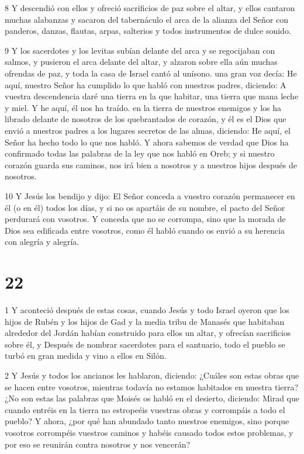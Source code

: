 \par 8 Y descendió con ellos y ofreció sacrificios de paz sobre el altar, y ellos cantaron muchas alabanzas y sacaron del tabernáculo el arca de la alianza del Señor con panderos, danzas, flautas, arpas, salterios y todos instrumentos de dulce sonido.

\par 9 Y los sacerdotes y los levitas subían delante del arca y se regocijaban con salmos, y pusieron el arca delante del altar, y alzaron sobre ella aún muchas ofrendas de paz, y toda la casa de Israel cantó al unísono. una gran voz decía: He aquí, nuestro Señor ha cumplido lo que habló con nuestros padres, diciendo: A vuestra descendencia daré una tierra en la que habitar, una tierra que mana leche y miel. Y he aquí, él nos ha traído. en la tierra de nuestros enemigos y los ha librado delante de nosotros de los quebrantados de corazón, y él es el Dios que envió a nuestros padres a los lugares secretos de las almas, diciendo: He aquí, el Señor ha hecho todo lo que nos habló. Y ahora sabemos de verdad que Dios ha confirmado todas las palabras de la ley que nos habló en Oreb; y si nuestro corazón guarda sus caminos, nos irá bien a nosotros y a nuestros hijos después de nosotros.

\par 10 Y Jesús los bendijo y dijo: El Señor conceda a vuestro corazón permanecer en él (o en él) todos los días, y si no os apartáis de su nombre, el pacto del Señor perdurará con vosotros. Y conceda que no se corrompa, sino que la morada de Dios sea edificada entre vosotros, como él habló cuando os envió a su herencia con alegría y alegría.



\chapter{22}

\par 1 Y aconteció después de estas cosas, cuando Jesús y todo Israel oyeron que los hijos de Rubén y los hijos de Gad y la media tribu de Manasés que habitaban alrededor del Jordán habían construido para ellos un altar, y ofrecían sacrificios sobre él, y Después de nombrar sacerdotes para el santuario, todo el pueblo se turbó en gran medida y vino a ellos en Silón.

\par 2 Y Jesús y todos los ancianos les hablaron, diciendo: ¿Cuáles son estas obras que se hacen entre vosotros, mientras todavía no estamos habitados en nuestra tierra? ¿No son estas las palabras que Moisés os habló en el desierto, diciendo: Mirad que cuando entréis en la tierra no estropeéis vuestras obras y corrompáis a todo el pueblo? Y ahora, ¿por qué han abundado tanto nuestros enemigos, sino porque vosotros corrompéis vuestros caminos y habéis causado todos estos problemas, y por eso se reunirán contra nosotros y nos vencerán?

